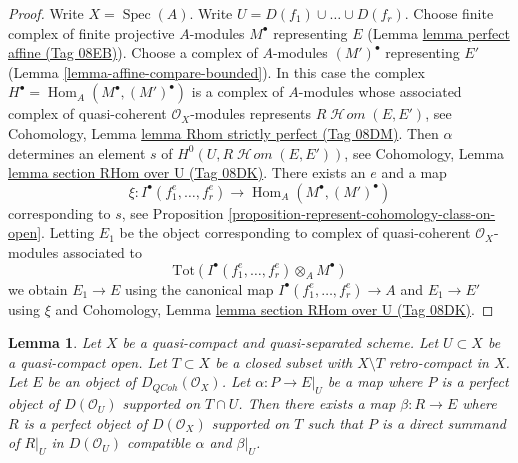 \documentclass{amsart}
\theoremstyle{plain}
\newtheorem{lemma}[subsection]{Lemma}
\theoremstyle{definition}
\theoremstyle{remark}
\numberwithin{equation}{subsection}
\def\Spec{\mathop{\mathrm{Spec}}}
\def\Hom{\mathop{\mathrm{Hom}}\nolimits}
\def\SheafHom{\mathop{\mathcal{H}\!\mathit{om}}\nolimits}
\def\QCoh{\mathit{QCoh}}
\begin{document}
\begin{proof}
Write $X = \Spec(A)$. Write $U = D(f_1) \cup \ldots \cup D(f_r)$. Choose
finite complex of finite projective $A$-modules $M^\bullet$ representing
$E$ (Lemma \href{https://stacks.math.columbia.edu/tag/08EB}{lemma perfect affine (Tag 08EB)}). Choose a complex of $A$-modules
$(M')^\bullet$ representing $E'$ (Lemma \ref{lemma-affine-compare-bounded}).
In this case the complex $H^\bullet = \Hom_A(M^\bullet, (M')^\bullet)$
is a complex of $A$-modules whose associated complex of quasi-coherent
$\mathcal{O}_X$-modules represents $R\SheafHom(E, E')$, see
Cohomology, Lemma \href{https://stacks.math.columbia.edu/tag/08DM}{lemma Rhom strictly perfect (Tag 08DM)}.
Then $\alpha$ determines an element $s$ of $H^0(U, R\SheafHom(E, E'))$, see
Cohomology, Lemma \href{https://stacks.math.columbia.edu/tag/08DK}{lemma section RHom over U (Tag 08DK)}.
There exists an $e$ and a map
$$
\xi : I^\bullet(f_1^e, \ldots, f_r^e) \to \Hom_A(M^\bullet, (M')^\bullet)
$$
corresponding to $s$, see
Proposition \ref{proposition-represent-cohomology-class-on-open}.
Letting $E_1$ be the object corresponding to
complex of quasi-coherent $\mathcal{O}_X$-modules
associated to
$$
\text{Tot}(I^\bullet(f_1^e, \ldots, f_r^e) \otimes_A M^\bullet)
$$
we obtain $E_1 \to E$ using the canonical map
$I^\bullet(f_1^e, \ldots, f_r^e) \to A$ and $E_1 \to E'$
using $\xi$ and
Cohomology, Lemma \href{https://stacks.math.columbia.edu/tag/08DK}{lemma section RHom over U (Tag 08DK)}.
\end{proof}


\begin{lemma}
\label{lemma-lift-map-from-perfect-complex-with-support}
Let $X$ be a quasi-compact and quasi-separated scheme.
Let $U \subset X$ be a quasi-compact open. Let $T \subset X$
be a closed subset with $X \setminus T$ retro-compact in $X$.
Let $E$ be an object of $D_\QCoh(\mathcal{O}_X)$.
Let $\alpha : P \to E|_U$ be a map where $P$ is a perfect object of
$D(\mathcal{O}_U)$ supported on $T \cap U$. Then there exists a map
$\beta : R \to E$ where $R$ is a perfect object of $D(\mathcal{O}_X)$
supported on $T$ such that $P$ is a direct summand of $R|_U$ in
$D(\mathcal{O}_U)$ compatible $\alpha$ and $\beta|_U$.
\end{lemma}
\end{document}
